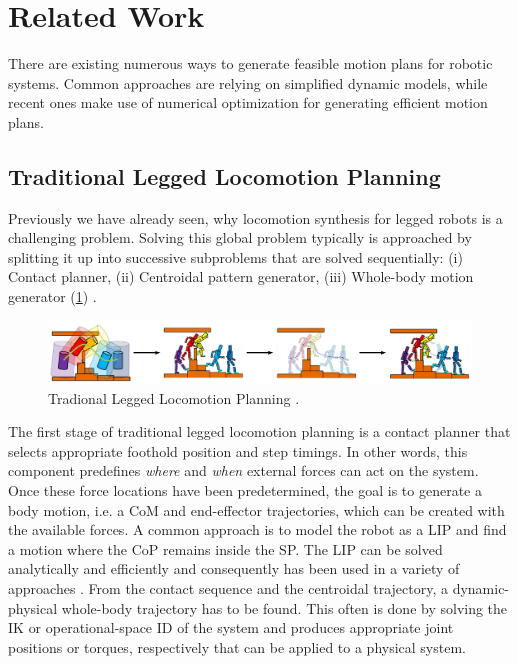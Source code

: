 \section{Related Work}
There are existing numerous ways to generate feasible motion plans for robotic systems. Common approaches are relying on simplified dynamic models, while recent ones make use of numerical optimization for generating efficient motion plans. 

\subsection{Traditional Legged Locomotion Planning}
Previously we have already seen, why locomotion synthesis for legged robots is a challenging problem. Solving this global problem typically is approached by splitting it up into successive subproblems that are solved sequentially: (i) Contact planner, (ii) Centroidal pattern generator, (iii) Whole-body motion generator (\cref{img:traditional_locomotion_planner}) \cite{carpentier2017multi}. 
\begin{figure}[h!]
\centering	
\includegraphics[width=1\textwidth]{img/traditional_locomotion_planner.jpg}
\caption{Tradional Legged Locomotion Planning \cite{giraud2020motion}.}
\label{img:traditional_locomotion_planner}
\end{figure}  
The first stage of traditional legged locomotion planning is a contact planner that selects appropriate foothold position and step timings. In other words, this component predefines \textit{where} and \textit{when} external forces can act on the system. 
Once these force locations have been predetermined, the goal is to generate a body motion, i.e. a \gls{CoM} and end-effector trajectories, which can be created with the available forces. A common approach is to model the robot as a \gls{LIP} and find a motion where the \gls{CoP} remains inside the \gls{SP}. The \gls{LIP} can be solved analytically and efficiently and consequently has been used in a variety of approaches \cite{kajita2003biped, kalakrishnan2010fast, winkler2015planning, bellicoso2017dynamic}. 
From the contact sequence and the centroidal trajectory, a dynamic-physical whole-body trajectory has to be found. This often is done by solving the \gls{IK} \cite{espiau1992new} or operational-space \gls{ID} \cite{khatib1987unified} of the system and produces appropriate joint positions or torques, respectively that can be applied to a physical system.

